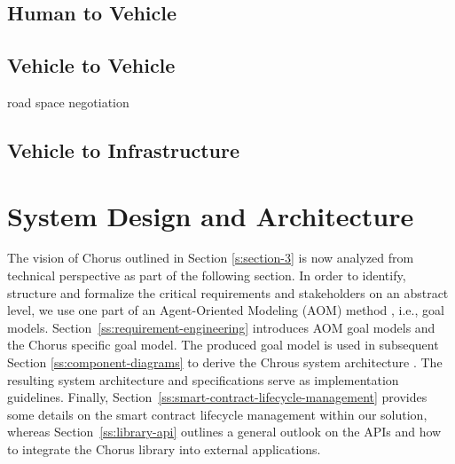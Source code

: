 \documentclass{llncs}
\begin{document}
{		\subsection{Human to Vehicle}
		
		\subsection{Vehicle to Vehicle}
			\label{ss:V2V}
			
				road space negotiation
			
		\subsection{Vehicle to Infrastructure}					
		


	
	
	\section{System Design and Architecture}
		\label{s:section-4}	


		The vision of Chorus outlined in Section \ref{s:section-3} is now analyzed from technical perspective as part of the following section. In order to identify, structure and formalize the critical requirements and stakeholders on an abstract level, we use one part of an Agent-Oriented Modeling (AOM) method \cite{sterling2009art}, i.e., goal models. Section~\ref{ss:requirement-engineering} introduces AOM goal models and the Chorus specific goal model. The produced goal model is used in subsequent Section \ref{ss:component-diagrams} to derive the Chrous system architecture . The resulting system architecture and specifications serve as implementation guidelines. Finally, Section~\ref{ss:smart-contract-lifecycle-management} provides some details on the smart contract lifecycle management within our solution, whereas Section~\ref{ss:library-api} outlines a general outlook on the APIs and how to integrate the Chorus library into external applications.
		
		
		
}
\end{document}
